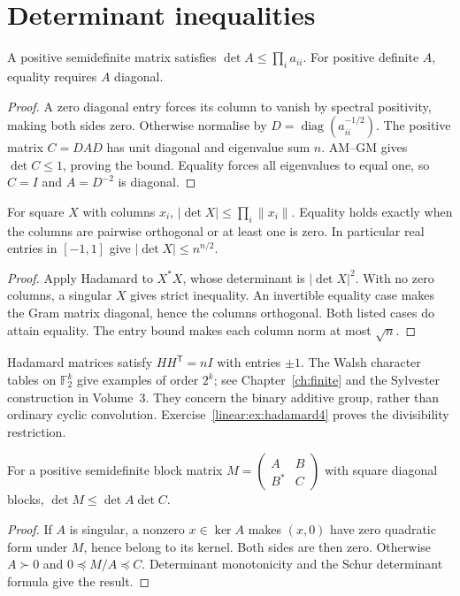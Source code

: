 \section{Determinant inequalities}
\begin{theorem}\label{linear:thm:hadamard}
A positive semidefinite matrix satisfies $\det A\le\prod_i a_{ii}$. For positive definite $A$, equality requires $A$ diagonal.
\end{theorem}
\begin{proof}
A zero diagonal entry forces its column to vanish by spectral positivity, making both sides zero. Otherwise normalise by $D=\operatorname{diag}(a_{ii}^{-1/2})$. The positive matrix $C=DAD$ has unit diagonal and eigenvalue sum $n$. AM--GM gives $\det C\le1$, proving the bound. Equality forces all eigenvalues to equal one, so $C=I$ and $A=D^{-2}$ is diagonal.
\end{proof}

\begin{corollary}\label{linear:cor:hadamardvol}
For square $X$ with columns $x_i$, $|\det X|\le\prod_i\|x_i\|$. Equality holds exactly when the columns are pairwise orthogonal or at least one is zero. In particular real entries in $[-1,1]$ give $|\det X|\le n^{n/2}$.
\end{corollary}
\begin{proof}
Apply Hadamard to $X^*X$, whose determinant is $|\det X|^2$. With no zero columns, a singular $X$ gives strict inequality. An invertible equality case makes the Gram matrix diagonal, hence the columns orthogonal. Both listed cases do attain equality. The entry bound makes each column norm at most $\sqrt n$.
\end{proof}

Hadamard matrices satisfy $HH^{\mathsf T}=nI$ with entries $\pm1$. The Walsh character tables on $\mathbb F_2^k$ give examples of order $2^k$; see Chapter~\ref{ch:finite} and the Sylvester construction in Volume~3. They concern the binary additive group, rather than ordinary cyclic convolution. Exercise~\ref{linear:ex:hadamard4} proves the divisibility restriction.

\begin{theorem}\label{linear:thm:fischer}
For a positive semidefinite block matrix $M=\begin{pmatrix}A&B\\B^*&C\end{pmatrix}$ with square diagonal blocks, $\det M\le\det A\det C$.
\end{theorem}
\begin{proof}
If $A$ is singular, a nonzero $x\in\ker A$ makes $(x,0)$ have zero quadratic form under $M$, hence belong to its kernel. Both sides are then zero. Otherwise $A\succ0$ and $0\preceq M/A\preceq C$. Determinant monotonicity and the Schur determinant formula give the result.
\end{proof}

